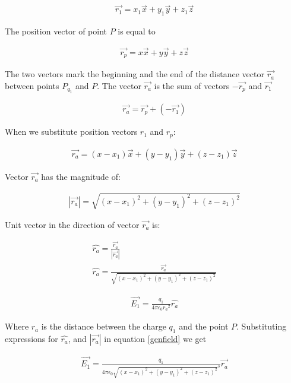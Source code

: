 \documentclass{ximera}
\begin{document}
\begin{eqnarray}
\vec{r_1}=x_1 \vec{x} + y_1 \vec{y} +z_1 \vec{z}
\end{eqnarray}

The position vector of point $P$ is equal to

\begin{eqnarray}
\vec{r_p}=x\vec{x} + y \vec{y} +z \vec{z}
\end{eqnarray}

The two vectors mark the beginning and the end of the distance vector $\vec{r_a}$  between points $P_{q_1}$ and $P$. The vector  $\vec{r_a}$ is the sum of vectors $-\vec{r_p}$ and $\vec{r_1}$



\begin{eqnarray}
\vec{r_a}=\vec{r_p} + (-\vec{r_1})
\end{eqnarray}

When we substitute position vectors $r_1$ and $r_p$:

\begin{eqnarray}
\vec{r_a}= (x - x_1) \vec{x} +(y - y_1) \vec{y} +(z - z_1) \vec{z}
\end{eqnarray}

Vector $\vec{r_a}$ has the magnitude of:


\begin{eqnarray}
|\vec{r_a}|= \sqrt{(x - x_1)^2 +(y - y_1)^2 +(z - z_1)^2}
\end{eqnarray}

Unit vector in the direction of vector $\vec{r_a}$ is:


\begin{eqnarray}
\hat{r_a}= \frac{\vec{r_a}}{|\vec{r_a}|} \\
\hat{r_a}=\frac{\vec{r_a}}{\sqrt{(x - x_1)^2 +(y - y_1)^2 +(z - z_1)^2}}
\end{eqnarray}



\begin{eqnarray}
\vec{E_1}=\frac{q_1}{4 \pi \epsilon_{0} {r_a}^2} \hat{r_a}
\end{eqnarray}

Where $r_a$ is the distance between the charge $q_1$ and the point $P$. Substituting expressions for $\hat{r_a}$, and $|\vec{r_a}|$ in equation \ref{genfield} we get

 



\begin{eqnarray}
\vec{E_1}=\frac{q_1}{4 \pi \epsilon_{0} {\sqrt{(x - x_1)^2 +(y - y_1)^2 +(z - z_1)^2}
}^3} \vec{r_a} \label{eqonecharge}
\end{eqnarray}
\end{document}
